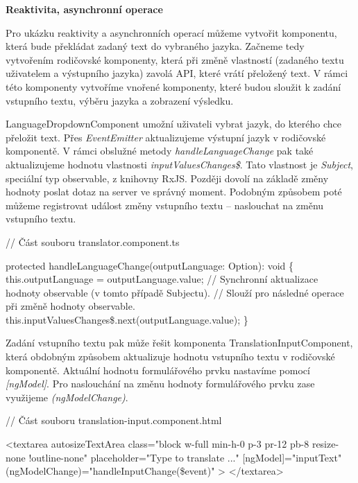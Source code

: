 \begin{flushleft}
  \textbf{Reaktivita, asynchronní operace}
\end{flushleft}

Pro ukázku reaktivity a asynchronních operací můžeme vytvořit komponentu, která bude překládat zadaný text do vybraného jazyka. 
Začneme tedy vytvořením rodičovské komponenty, která při změně vlastností (zadaného textu uživatelem a výstupního jazyka) zavolá API, které vrátí přeložený text. 
V rámci této komponenty vytvoříme vnořené komponenty, které budou sloužit k zadání vstupního textu, výběru jazyka a zobrazení výsledku. 

LanguageDropdownComponent umožní uživateli vybrat jazyk, do kterého chce přeložit text. 
Přes \emph{EventEmitter} aktualizujeme výstupní jazyk v rodičovské komponentě. V rámci obslužné metody \emph{handleLanguageChange} pak také aktualizujeme hodnotu vlastnosti \emph{inputValuesChanges\$}.
Tato vlastnost je \emph{Subject}, speciální typ observable, z knihovny RxJS. Později dovolí na základě změny hodnoty poslat dotaz na server ve správný moment. 
Podobným způsobem poté můžeme registrovat událost změny vstupního textu -- naslouchat na změnu vstupního textu.

\begin{prog}
// Část souboru translator.component.ts

protected handleLanguageChange(outputLanguage: Option): void \{
  this.outputLanguage = outputLanguage.value;
  // Synchronní aktualizace hodnoty observable (v tomto případě Subjectu).
  // Slouží pro následné operace při změně hodnoty observable.
  this.inputValuesChanges\$.next(outputLanguage.value);
\}
\end{prog}

Zadání vstupního textu pak může řešit komponenta TranslationInputComponent, která obdobným způsobem aktualizuje hodnotu vstupního textu v rodičovské komponentě. 
Aktuální hodnotu formulářového prvku nastavíme pomocí \emph{[ngModel]}. Pro naslouchání na změnu hodnoty formulářového prvku zase využijeme \emph{(ngModelChange)}.

\begin{prog}
// Část souboru translation-input.component.html

<textarea
  autosizeTextArea
  class="block w-full min-h-0 p-3 pr-12 pb-8 resize-none !outline-none"
  placeholder="Type to translate ..."
  [ngModel]="inputText"
  (ngModelChange)="handleInputChange(\$event)"
>
</textarea>
\end{prog}

